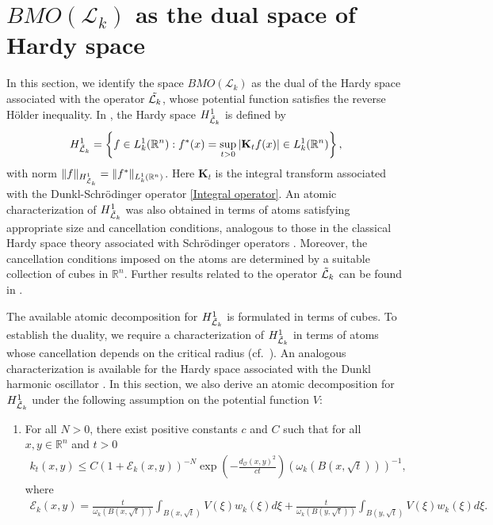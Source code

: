 \documentclass[11pt, reqno]{amsproc}
\theoremstyle{definition}
\theoremstyle{remark}
\numberwithin{equation}{section}
\begin{document}
\section{$BMO(\mathcal{L}_k)$ as the dual space of Hardy space} \label{S:4}
In this section, we identify the space $BMO(\mathcal{L}_k)$ as the dual of the Hardy space associated with the operator $\Tilde{\mathcal{L}_k}$, whose potential function satisfies the reverse H\"older inequality. In \cite{Hejna-2021}, the Hardy space $H_{\Tilde{\mathcal{L}}_k}^1$ is defined by
\begin{align*}
    H_{\Tilde{\mathcal{L}}_k}^1 = \left\{ f \in L_k^1(\mathbb{R}^n) : f^*(x) = \sup_{t>0} |\mathbf{K}_t f(x)| \in L_k^1(\mathbb{R}^n) \right\},
\end{align*}
with norm $\|f\|_{H_{\Tilde{\mathcal{L}}_k}^1} = \|f^*\|_{L_k^1(\mathbb{R}^n)}$. Here $\mathbf{K}_t$ is the integral transform associated with the Dunkl-Schr\"odinger operator \eqref{Integral operator}. An atomic characterization of $H_{\Tilde{\mathcal{L}}_k}^1$ was also obtained in terms of atoms satisfying appropriate size and cancellation conditions, analogous to those in the classical Hardy space theory associated with Schr\"odinger operators \cite{Jacek-2004}. Moreover, the cancellation conditions imposed on the atoms are determined by a suitable collection of cubes in $\mathbb{R}^n$. Further results related to the operator $\Tilde{\mathcal{L}}_k$ can be found in \cite{Jacek-2025, Hejna-2021, Hejna-2021_2}. 
\par The available atomic decomposition for $H_{\Tilde{\mathcal{L}}_k}^1$ is formulated in terms of cubes. To establish the duality, we require a characterization of $H_{\Tilde{\mathcal{L}}_k}^1$ in terms of atoms whose cancellation depends on the critical radius (cf.\ \cite{Dziubanski-2005}). An analogous characterization is available for the Hardy space associated with the Dunkl harmonic oscillator \cite{Hejna-2020}. In this section, we also derive an atomic decomposition for $H_{\Tilde{\mathcal{L}}_k}^1$ under the following assumption on the potential function $V$: \\ 
\begin{enumerate}[$(i)$]
    \item For all $N>0$, there exist positive constants $c $ and $ C $ such that for all $x,y\in \mathbb{R}^n$ and $t>0$ 
\begin{align} 
    k_t(x,y) \leq C {\left( 1+ \mathcal{E}_k(x,y)\mathcal{}   \right) ^{-N} } \exp\left(-\frac{d_\mathcal{O}(x,y)^2}{ct} \right) \left(\omega_k(B(x,\sqrt{t}))\right)^{-1}
    , \label{assumption-1} 
\end{align} where
\begin{align*} 
\mathcal{E}_k(x,y)=\frac{t}{\omega_k(B(x,\sqrt{t}))} \int_{B(x,\sqrt{t})} V(\xi)w_k(\xi)d\xi + \frac{t}{\omega_k(B(y,\sqrt{t}))} \int_{B(y,\sqrt{t})} V(\xi)w_k(\xi)d\xi.
\end{align*} 

\end{enumerate}
\end{document}
